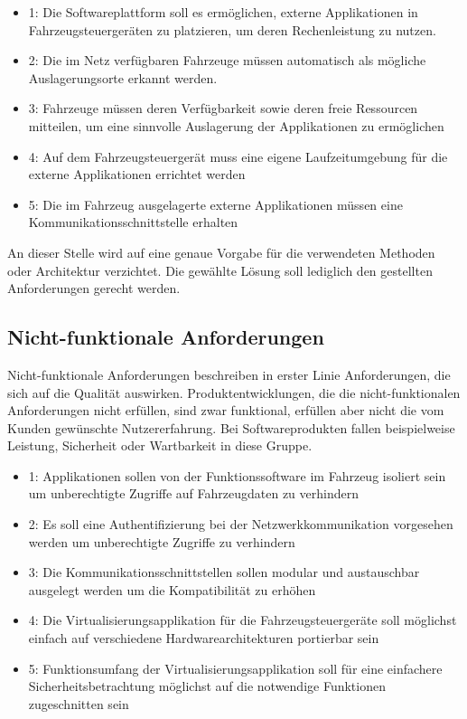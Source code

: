 \begin{itemize}
    \item 1: Die Softwareplattform soll es ermöglichen, externe Applikationen in Fahrzeugsteuergeräten zu platzieren, um deren Rechenleistung zu nutzen.
    \item 2: Die im Netz verfügbaren Fahrzeuge müssen automatisch als mögliche Auslagerungsorte erkannt werden.
    \item 3: Fahrzeuge müssen deren Verfügbarkeit sowie deren freie Ressourcen mitteilen, um eine sinnvolle Auslagerung der Applikationen zu ermöglichen
    \item 4: Auf dem Fahrzeugsteuergerät muss eine eigene Laufzeitumgebung für die externe Applikationen errichtet werden
    \item 5: Die im Fahrzeug ausgelagerte externe Applikationen müssen eine Kommunikationsschnittstelle erhalten
\end{itemize}

An dieser Stelle wird auf eine genaue Vorgabe für die verwendeten Methoden oder Architektur verzichtet. Die gewählte Lösung soll lediglich den gestellten Anforderungen gerecht werden. 

\subsection{Nicht-funktionale Anforderungen}

Nicht-funktionale Anforderungen beschreiben in erster Linie Anforderungen, die sich auf die Qualität auswirken. Produktentwicklungen, die die nicht-funktionalen Anforderungen nicht erfüllen, sind zwar funktional, erfüllen aber nicht die vom Kunden gewünschte Nutzererfahrung. Bei Softwareprodukten fallen beispielweise Leistung, Sicherheit oder Wartbarkeit in diese Gruppe. 

\begin{itemize}
    \item 1: Applikationen sollen von der Funktionssoftware im Fahrzeug isoliert sein um unberechtigte Zugriffe auf Fahrzeugdaten zu verhindern
    \item 2: Es soll eine Authentifizierung bei der Netzwerkkommunikation vorgesehen werden um unberechtigte Zugriffe zu verhindern
    \item 3: Die Kommunikationsschnittstellen sollen modular und austauschbar ausgelegt werden um die Kompatibilität zu erhöhen
    \item 4: Die Virtualisierungsapplikation für die Fahrzeugsteuergeräte soll möglichst einfach auf verschiedene Hardwarearchitekturen portierbar sein
    \item 5: Funktionsumfang der Virtualisierungsapplikation soll für eine einfachere Sicherheitsbetrachtung möglichst auf die notwendige Funktionen zugeschnitten sein
\end{itemize}

